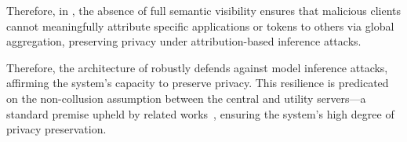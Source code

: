Therefore, in \Sys, the absence of full semantic visibility ensures that malicious clients cannot meaningfully attribute specific applications or tokens to others via global aggregation, preserving privacy under attribution-based inference attacks.

Therefore, the architecture of \Sys robustly defends against model inference attacks, affirming the system's capacity to preserve privacy. This resilience is predicated on the non-collusion assumption between the central and utility servers—a standard premise upheld by related works~\cite{roy2020crypte,wu2022federated}, ensuring the system's high degree of privacy preservation.

